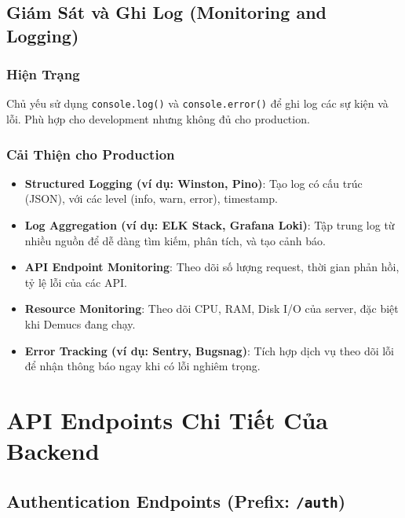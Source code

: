 \documentclass[12pt,a4paper]{article}
\begin{document}
\subsection{Giám Sát và Ghi Log (Monitoring and Logging)}
\label{subsec:monitoring}

\subsubsection{Hiện Trạng}
Chủ yếu sử dụng \texttt{console.log()} và \texttt{console.error()} để ghi log các sự kiện và lỗi. Phù hợp cho development nhưng không đủ cho production.

\subsubsection{Cải Thiện cho Production}
\begin{itemize}
    \item \textbf{Structured Logging (ví dụ: Winston, Pino)}: Tạo log có cấu trúc (JSON), với các level (info, warn, error), timestamp.
    \item \textbf{Log Aggregation (ví dụ: ELK Stack, Grafana Loki)}: Tập trung log từ nhiều nguồn để dễ dàng tìm kiếm, phân tích, và tạo cảnh báo.
    \item \textbf{API Endpoint Monitoring}: Theo dõi số lượng request, thời gian phản hồi, tỷ lệ lỗi của các API.
    \item \textbf{Resource Monitoring}: Theo dõi CPU, RAM, Disk I/O của server, đặc biệt khi Demucs đang chạy.
    \item \textbf{Error Tracking (ví dụ: Sentry, Bugsnag)}: Tích hợp dịch vụ theo dõi lỗi để nhận thông báo ngay khi có lỗi nghiêm trọng.
\end{itemize}

\section{API Endpoints Chi Tiết Của Backend}
\label{sec:api-endpoints}

\subsection{Authentication Endpoints (Prefix: \texttt{/auth})}
\label{subsec:auth-endpoints}
\end{document}
